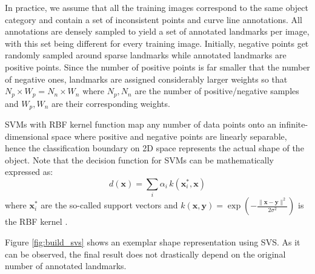 In practice, we assume that all the training images correspond to the same object category and contain a set of inconsistent points and curve line annotations. All annotations are densely sampled to yield a set of annotated landmarks per image, with this set being different for every training image. Initially, negative points get randomly sampled around sparse landmarks while annotated landmarks are positive points. Since the number of positive points is far smaller that the number of negative ones, landmarks are assigned considerably larger weights so that $N_p \times W_p=N_n \times W_n$ where $N_p, N_n$ are the number of positive/negative samples and $W_p, W_n$ are their corresponding weights.

SVMs with RBF kernel function map any number of data points onto an infinite-dimensional space where positive and negative points are linearly separable, hence the classification boundary on 2D space represents the actual shape of the object. Note that the decision function for SVMs can be mathematically expressed as:
\begin{equation} \label{eq:decisionfunc}
    d(\bm{x})=\sum_i\alpha_i \, k(\bm{x}_i^*,\bm{x})
\end{equation}
where $\bm{x}_i^*$ are the so-called support vectors and \mbox{$k(\bm{x}, \bm{y}) = \exp\left(-\frac{\|\bm{x} -\bm{y}\|^2}{2 \sigma^2}\right)$} is the RBF kernel .

Figure \ref{fig:build_svs} shows an exemplar shape representation using SVS. As it can be observed, the final result does not drastically depend on the original number of annotated landmarks.




